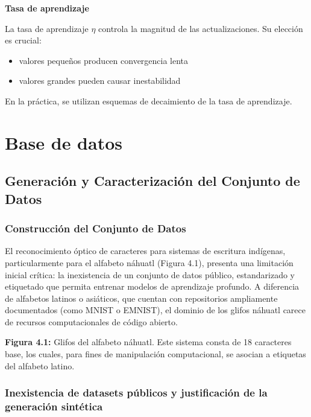 \documentclass[
  spanish,
  us-letterpaper,
  DIV=11,
  numbers=noendperiod]{scrreprt}
\providecommand{\tightlist}{%
  \setlength{\itemsep}{0pt}\setlength{\parskip}{0pt}}
\begin{document}
\textbf{Tasa de aprendizaje}

La tasa de aprendizaje \(\eta\) controla la magnitud de las
actualizaciones. Su elección es crucial:

\begin{itemize}
\tightlist
\item
  valores pequeños producen convergencia lenta\\
\item
  valores grandes pueden causar inestabilidad
\end{itemize}

En la práctica, se utilizan esquemas de decaimiento de la tasa de
aprendizaje.


\chapter{Base de datos}\label{base-de-datos}

\section{Generación y Caracterización del Conjunto de
Datos}\label{generaciuxf3n-y-caracterizaciuxf3n-del-conjunto-de-datos}

\subsection{Construcción del Conjunto de
Datos}\label{construcciuxf3n-del-conjunto-de-datos}

El reconocimiento óptico de caracteres para sistemas de escritura
indígenas, particularmente para el alfabeto náhuatl (Figura 4.1),
presenta una limitación inicial crítica: la inexistencia de un conjunto
de datos público, estandarizado y etiquetado que permita entrenar
modelos de aprendizaje profundo. A diferencia de alfabetos latinos o
asiáticos, que cuentan con repositorios ampliamente documentados (como
MNIST o EMNIST), el dominio de los glifos náhuatl carece de recursos
computacionales de código abierto.

\textbf{Figura 4.1:} Glifos del alfabeto náhuatl. Este sistema consta de
18 caracteres base, los cuales, para fines de manipulación
computacional, se asocian a etiquetas del alfabeto latino.

\subsection{Inexistencia de datasets públicos y justificación de la
generación
sintética}\label{inexistencia-de-datasets-puxfablicos-y-justificaciuxf3n-de-la-generaciuxf3n-sintuxe9tica}
\end{document}
